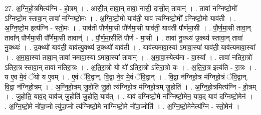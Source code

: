 \documentclass[17pt]{extarticle}
\begin{document}
27. अ॒ग्नि॒हो॒त्रमित्य॑ग्नि - हो॒त्रम् । . आसी॒त् तावा॒न् तावा॒ नासी॒ दासी॒त् तावान्॑ । . तावा॑ नग्निष्टो॒मो᳚ ऽग्निष्टो॒म स्तावा॒न् तावा॑ नग्निष्टो॒मः । . अ॒ग्नि॒ष्टो॒मो याव॑ती॒ याव॑ त्यग्निष्टो॒मो᳚ ऽग्निष्टो॒मो याव॑ती । . अ॒ग्नि॒ष्टो॒म इत्य॑ग्नि - स्तो॒मः । . याव॑ती पौर्णमा॒सी पौ᳚र्णमा॒सी याव॑ती॒ याव॑ती पौर्णमा॒सी । . पौ॒र्ण॒मा॒सी तावा॒न् तावा᳚न् पौर्णमा॒सी पौ᳚र्णमा॒सी तावान्॑ । . पौ॒र्ण॒मा॒सीति॑ पौर्ण - मा॒सी । . तावा॑ नु॒क्थ्य॑ उ॒क्थ्य॑ स्तावा॒न् तावा॑ नु॒क्थ्यः॑ । . उ॒क्थ्यो॑ याव॑ती॒ याव॑त्यु॒क्थ्य॑ उ॒क्थ्यो॑ याव॑ती । . याव॑त्यमावा॒स्या॑ ऽमावा॒स्या॑ याव॑ती॒ याव॑त्यमावा॒स्या᳚ । . अ॒मा॒वा॒स्या॑ तावा॒न् तावा॑ नमावा॒स्या॑ ऽमावा॒स्या॑ तावान्॑ । . अ॒मा॒वा॒स्येत्य॑मा - वा॒स्या᳚ । . तावा॑ नतिरा॒त्रो॑ ऽतिरा॒त्र स्तावा॒न् तावा॑ नतिरा॒त्रः । . अ॒ति॒रा॒त्रो यो यो॑ ऽतिरा॒त्रो॑ ऽतिरा॒त्रो यः । . अ॒ति॒रा॒त्र इत्य॑ति - रा॒त्रः । . य ए॒व मे॒वं ॅयो य ए॒वम् । . ए॒वं ॅवि॒द्वान्. वि॒द्वा ने॒व मे॒वं ॅवि॒द्वान् । . वि॒द्वा न॑ग्निहो॒त्र म॑ग्निहो॒त्रं ॅवि॒द्वान्. वि॒द्वा न॑ग्निहो॒त्रम् । . अ॒ग्नि॒हो॒त्रम् जु॒होति॑ जु॒हो त्य॑ग्निहो॒त्र म॑ग्निहो॒त्रम् जु॒होति॑ । . अ॒ग्नि॒हो॒त्रमित्य॑ग्नि - हो॒त्रम् । . जु॒होति॒ याव॒द् याव॑ज् जु॒होति॑ जु॒होति॒ याव॑त् । . याव॑ दग्निष्टो॒मे ना᳚ग्निष्टो॒मेन॒ याव॒द् याव॑ दग्निष्टो॒मेन॑ । . अ॒ग्नि॒ष्टो॒मे नो॑पा॒प्नो त्यु॑पा॒प्नो त्य॑ग्निष्टो॒मे ना᳚ग्निष्टो॒मे नो॑पा॒प्नोति॑ । . अ॒ग्नि॒ष्टो॒मेनेत्य॑ग्नि - स्तो॒मेन॑ । \newline
\end{document}
